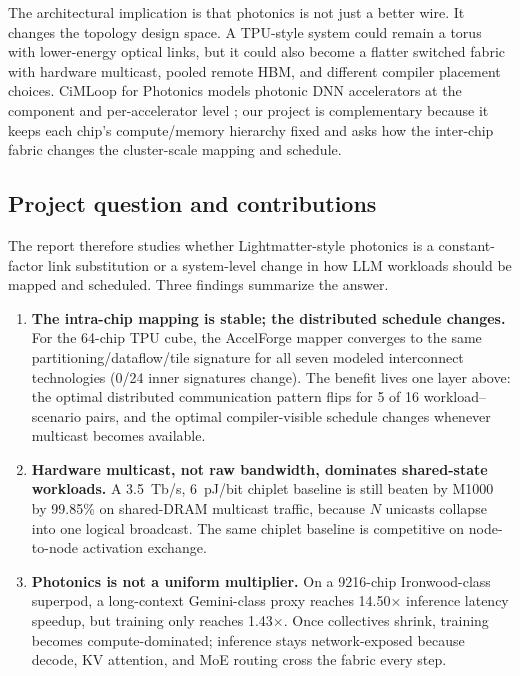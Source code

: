 \documentclass[conference]{IEEEtran}
\newcommand{\pjbit}{pJ/bit}
\newcommand{\tbps}{Tb/s}
\begin{document}
The architectural implication is that photonics is not just a better
wire. It changes the topology design space. A TPU-style system could
remain a torus with lower-energy optical links, but it could also
become a flatter switched fabric with hardware multicast, pooled
remote HBM, and different compiler placement choices. CiMLoop for
Photonics models photonic DNN accelerators at the component and
per-accelerator level \cite{ciml-photonics}; our project is
complementary because it keeps each chip's compute/memory hierarchy
fixed and asks how the inter-chip fabric changes the cluster-scale
mapping and schedule.

\subsection{Project question and contributions}
The report therefore studies whether Lightmatter-style photonics is
a constant-factor link substitution or a system-level change in how
LLM workloads should be mapped and scheduled. Three findings
summarize the answer.
\begin{enumerate}
    \item \textbf{The intra-chip mapping is stable; the distributed
    schedule changes.} For the 64-chip TPU cube, the AccelForge mapper
    converges to the same partitioning/dataflow/tile signature for all
    seven modeled interconnect technologies (0/24 inner signatures
    change). The benefit lives one layer above: the optimal
    distributed communication pattern flips for 5 of 16
    workload--scenario pairs, and the optimal compiler-visible
    schedule changes whenever multicast becomes available.
    \item \textbf{Hardware multicast, not raw bandwidth, dominates
    shared-state workloads.} A 3.5~\tbps{}, 6~\pjbit{} chiplet
    baseline is still beaten by M1000 by 99.85\% on shared-DRAM
    multicast traffic, because $N$ unicasts collapse into one logical
    broadcast. The same chiplet baseline is competitive on
    node-to-node activation exchange.
    \item \textbf{Photonics is not a uniform multiplier.} On a
    9216-chip Ironwood-class superpod, a long-context Gemini-class
    proxy reaches 14.50$\times$ inference latency speedup, but
    training only reaches 1.43$\times$. Once collectives shrink,
    training becomes compute-dominated; inference stays
    network-exposed because decode, KV attention, and MoE routing
    cross the fabric every step.
\end{enumerate}
\end{document}
